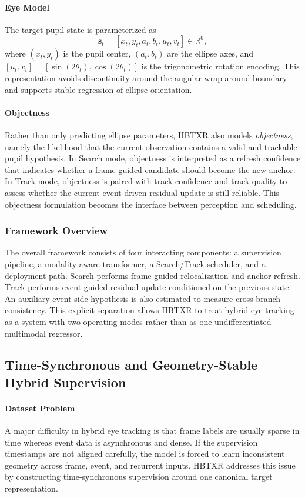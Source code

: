 \documentclass[journal]{IEEEtran}
\begin{document}
\paragraph*{Eye Model}
The target pupil state is parameterized as
\begin{equation}
\mathbf{s}_t = [x_t, y_t, a_t, b_t, u_t, v_t] \in \mathbb{R}^{6},
\end{equation}
where $(x_t,y_t)$ is the pupil center, $(a_t,b_t)$ are the ellipse axes, and $[u_t,v_t]=[\sin(2\theta_t),\cos(2\theta_t)]$ is the trigonometric rotation encoding. This representation avoids discontinuity around the angular wrap-around boundary and supports stable regression of ellipse orientation.

\paragraph*{Objectness}
Rather than only predicting ellipse parameters, HBTXR also models \emph{objectness}, namely the likelihood that the current observation contains a valid and trackable pupil hypothesis. In Search mode, objectness is interpreted as a refresh confidence that indicates whether a frame-guided candidate should become the new anchor. In Track mode, objectness is paired with track confidence and track quality to assess whether the current event-driven residual update is still reliable. This objectness formulation becomes the interface between perception and scheduling.

\subsubsection{Framework Overview}
The overall framework consists of four interacting components: a supervision pipeline, a modality-aware transformer, a Search/Track scheduler, and a deployment path. Search performs frame-guided relocalization and anchor refresh. Track performs event-guided residual update conditioned on the previous state. An auxiliary event-side hypothesis is also estimated to measure cross-branch consistency. This explicit separation allows HBTXR to treat hybrid eye tracking as a system with two operating modes rather than as one undifferentiated multimodal regressor.

\subsection{Time-Synchronous and Geometry-Stable Hybrid Supervision}
\paragraph*{Dataset Problem}
A major difficulty in hybrid eye tracking is that frame labels are usually sparse in time whereas event data is asynchronous and dense. If the supervision timestamps are not aligned carefully, the model is forced to learn inconsistent geometry across frame, event, and recurrent inputs. HBTXR addresses this issue by constructing time-synchronous supervision around one canonical target representation.
\end{document}
